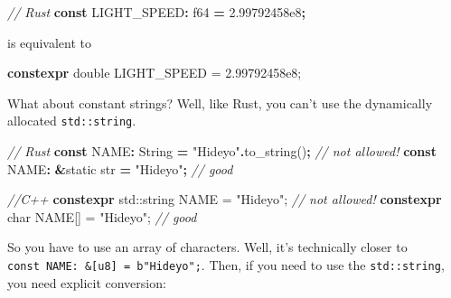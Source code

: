 \documentclass[
]{book}
\newenvironment{Shaded}{\begin{snugshade}}{\end{snugshade}}
\newcommand{\BuiltInTok}[1]{#1}
\newcommand{\CommentTok}[1]{\textcolor[rgb]{0.56,0.35,0.01}{\textit{#1}}}
\newcommand{\DataTypeTok}[1]{\textcolor[rgb]{0.13,0.29,0.53}{#1}}
\newcommand{\DecValTok}[1]{\textcolor[rgb]{0.00,0.00,0.81}{#1}}
\newcommand{\FloatTok}[1]{\textcolor[rgb]{0.00,0.00,0.81}{#1}}
\newcommand{\KeywordTok}[1]{\textcolor[rgb]{0.13,0.29,0.53}{\textbf{#1}}}
\newcommand{\NormalTok}[1]{#1}
\newcommand{\OperatorTok}[1]{\textcolor[rgb]{0.81,0.36,0.00}{\textbf{#1}}}
\newcommand{\OtherTok}[1]{\textcolor[rgb]{0.56,0.35,0.01}{#1}}
\newcommand{\StringTok}[1]{\textcolor[rgb]{0.31,0.60,0.02}{#1}}
\begin{document}
\begin{Shaded}
\begin{Highlighting}[]
\CommentTok{// Rust}
\KeywordTok{const}\NormalTok{ LIGHT\_SPEED}\OperatorTok{:} \DataTypeTok{f64} \OperatorTok{=} \DecValTok{2.99792458e8}\OperatorTok{;}
\end{Highlighting}
\end{Shaded}

is equivalent to

\begin{Shaded}
\begin{Highlighting}[]
\KeywordTok{constexpr} \DataTypeTok{double}\NormalTok{ LIGHT\_SPEED = }\FloatTok{2.99792458e8}\NormalTok{;}
\end{Highlighting}
\end{Shaded}

What about constant strings? Well, like Rust, you can't use the dynamically allocated \texttt{std::string}.

\begin{Shaded}
\begin{Highlighting}[]
\CommentTok{// Rust}
\KeywordTok{const}\NormalTok{ NAME}\OperatorTok{:} \DataTypeTok{String} \OperatorTok{=} \StringTok{"Hideyo"}\OperatorTok{.}\NormalTok{to\_string()}\OperatorTok{;} \CommentTok{// not allowed!}
\KeywordTok{const}\NormalTok{ NAME}\OperatorTok{:} \OperatorTok{\&}\OtherTok{\textquotesingle{}static} \DataTypeTok{str} \OperatorTok{=} \StringTok{"Hideyo"}\OperatorTok{;}       \CommentTok{// good}
\end{Highlighting}
\end{Shaded}

\begin{Shaded}
\begin{Highlighting}[]
\CommentTok{//C++}
\KeywordTok{constexpr} \BuiltInTok{std::}\NormalTok{string NAME = }\StringTok{"Hideyo"}\NormalTok{; }\CommentTok{// not allowed!}
\KeywordTok{constexpr} \DataTypeTok{char}\NormalTok{ NAME[] = }\StringTok{"Hideyo"}\NormalTok{;      }\CommentTok{// good}
\end{Highlighting}
\end{Shaded}

So you have to use an array of characters. Well, it's technically closer to \texttt{const\ NAME:\ \&{[}u8{]}\ =\ b"Hideyo";}. Then, if you need to use the \texttt{std::string}, you need explicit conversion:
\end{document}
